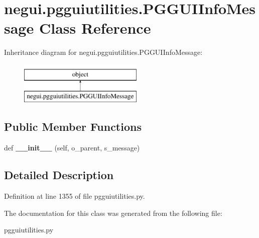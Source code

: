 \hypertarget{classnegui_1_1pgguiutilities_1_1PGGUIInfoMessage}{}\section{negui.\+pgguiutilities.\+P\+G\+G\+U\+I\+Info\+Message Class Reference}
\label{classnegui_1_1pgguiutilities_1_1PGGUIInfoMessage}
Inheritance diagram for negui.\+pgguiutilities.\+P\+G\+G\+U\+I\+Info\+Message\+:\begin{figure}[H]
\begin{center}
\leavevmode
\includegraphics[height=2.000000cm]{classnegui_1_1pgguiutilities_1_1PGGUIInfoMessage}
\end{center}
\end{figure}
\subsection*{Public Member Functions}
\begin{DoxyCompactItemize}
\item 
def {\bfseries \+\_\+\+\_\+init\+\_\+\+\_\+} (self, o\+\_\+parent, s\+\_\+message)\hypertarget{classnegui_1_1pgguiutilities_1_1PGGUIInfoMessage_a6610dd669862924d49f1ec400b4df128}{}\label{classnegui_1_1pgguiutilities_1_1PGGUIInfoMessage_a6610dd669862924d49f1ec400b4df128}

\end{DoxyCompactItemize}


\subsection{Detailed Description}


Definition at line 1355 of file pgguiutilities.\+py.



The documentation for this class was generated from the following file\+:\begin{DoxyCompactItemize}
\item 
pgguiutilities.\+py\end{DoxyCompactItemize}
